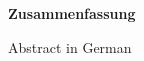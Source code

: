 
\clearemptydoublepage

\vspace*{2cm}
\begin{center}
{\Large \bf Zusammenfassung}
\end{center}
\vspace{1cm}

Abstract in German
